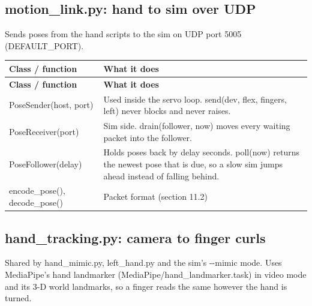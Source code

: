 \documentclass[11pt,letterpaper]{article}
\newcommand{\code}[1]{\textcolor{codeblue}{\ttfamily\smaller\relax #1}}
\begin{document}
\subsection{motion\_link.py: hand to sim over UDP}
Sends poses from the hand scripts to the sim on UDP port 5005 (\code{DEFAULT\_\allowbreak{}PORT}).

{\small
\begin{longtable}{|>{\raggedright\arraybackslash}p{}|>{\raggedright\arraybackslash}p{}|}
\hline
\rowcolor{tblhead}\textbf{Class / function} & \textbf{What it does} \\ \hline
\endfirsthead
\hline
\rowcolor{tblhead}\textbf{Class / function} & \textbf{What it does} \\ \hline
\endhead
\code{PoseSender(host,\allowbreak{} port)} & Used inside the servo loop. \code{send(dev,\allowbreak{} flex,\allowbreak{} fingers,\allowbreak{} left)} never blocks and never raises. \\ \hline
\code{PoseReceiver(port)} & Sim side. \code{drain(follower,\allowbreak{} now)} moves every waiting packet into the follower. \\ \hline
\code{PoseFollower(delay)} & Holds poses back by \code{delay} seconds. \code{poll(now)} returns the newest pose that is due, so a slow sim jumps ahead instead of falling behind. \\ \hline
\code{encode\_\allowbreak{}pose()}, \code{decode\_\allowbreak{}pose()} & Packet format (section 11.2) \\ \hline
\end{longtable}}


\subsection{hand\_tracking.py: camera to finger curls}
Shared by \code{hand\_\allowbreak{}mimic.py}, \code{left\_\allowbreak{}hand.py} and the sim's \code{-{}-{}mimic} mode. Uses MediaPipe's hand landmarker (\code{MediaPipe/\allowbreak{}hand\_\allowbreak{}landmarker.task}) in video mode and its 3-D world landmarks, so a finger reads the same however the hand is turned.
\end{document}

